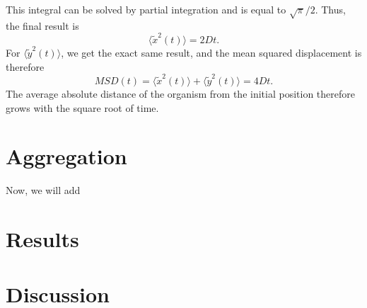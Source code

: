 \documentclass{article}
\begin{document}
This integral can be solved by partial integration and is equal to $\sqrt{\pi}/2$.
Thus, the final result is 
\begin{equation*}
    \langle \tilde{x}^2(t)\rangle = 2Dt.
\end{equation*}
For $\langle \tilde{y}^2(t)\rangle$, we get the exact same result, and the mean squared displacement is therefore
\begin{equation*}
    MSD(t) = \langle \tilde{x}^2(t)\rangle + \langle \tilde{y}^2(t)\rangle  = 4Dt.
\end{equation*}
The average absolute distance of the organism from the initial position therefore grows with the square root of time.

\section{Aggregation}
Now, we will add 
\section{Results}

\section{Discussion}
\printbibliography
\end{document}
